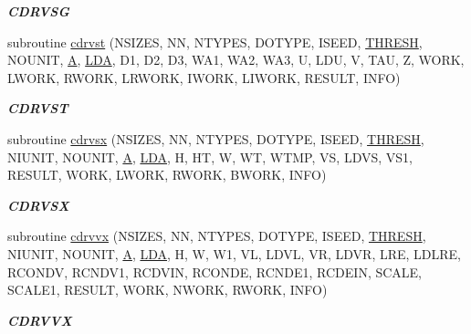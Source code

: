 \begin{DoxyCompactItemize}
\begin{DoxyCompactList}\small\item\em {\bfseries C\+D\+R\+V\+S\+G} \end{DoxyCompactList}\item 
subroutine \hyperlink{group__complex__eig_gacbd6f59fe241010a772c2d06a9d11d89}{cdrvst} (N\+S\+I\+Z\+E\+S, N\+N, N\+T\+Y\+P\+E\+S, D\+O\+T\+Y\+P\+E, I\+S\+E\+E\+D, \hyperlink{zlaqgs_8c_a0656018abfc9fa2821827415f5d5ea57}{T\+H\+R\+E\+S\+H}, N\+O\+U\+N\+I\+T, \hyperlink{classA}{A}, \hyperlink{example__user_8c_ae946da542ce0db94dced19b2ecefd1aa}{L\+D\+A}, D1, D2, D3, W\+A1, W\+A2, W\+A3, U, L\+D\+U, V, T\+A\+U, Z, W\+O\+R\+K, L\+W\+O\+R\+K, R\+W\+O\+R\+K, L\+R\+W\+O\+R\+K, I\+W\+O\+R\+K, L\+I\+W\+O\+R\+K, R\+E\+S\+U\+L\+T, I\+N\+F\+O)
\begin{DoxyCompactList}\small\item\em {\bfseries C\+D\+R\+V\+S\+T} \end{DoxyCompactList}\item 
subroutine \hyperlink{group__complex__eig_ga730ba08b058674ceabf267420c5c4d01}{cdrvsx} (N\+S\+I\+Z\+E\+S, N\+N, N\+T\+Y\+P\+E\+S, D\+O\+T\+Y\+P\+E, I\+S\+E\+E\+D, \hyperlink{zlaqgs_8c_a0656018abfc9fa2821827415f5d5ea57}{T\+H\+R\+E\+S\+H}, N\+I\+U\+N\+I\+T, N\+O\+U\+N\+I\+T, \hyperlink{classA}{A}, \hyperlink{example__user_8c_ae946da542ce0db94dced19b2ecefd1aa}{L\+D\+A}, H, H\+T, W, W\+T, W\+T\+M\+P, V\+S, L\+D\+V\+S, V\+S1, R\+E\+S\+U\+L\+T, W\+O\+R\+K, L\+W\+O\+R\+K, R\+W\+O\+R\+K, B\+W\+O\+R\+K, I\+N\+F\+O)
\begin{DoxyCompactList}\small\item\em {\bfseries C\+D\+R\+V\+S\+X} \end{DoxyCompactList}\item 
subroutine \hyperlink{group__complex__eig_ga2de5d5cdd79b4ab56fd984ac860f1b36}{cdrvvx} (N\+S\+I\+Z\+E\+S, N\+N, N\+T\+Y\+P\+E\+S, D\+O\+T\+Y\+P\+E, I\+S\+E\+E\+D, \hyperlink{zlaqgs_8c_a0656018abfc9fa2821827415f5d5ea57}{T\+H\+R\+E\+S\+H}, N\+I\+U\+N\+I\+T, N\+O\+U\+N\+I\+T, \hyperlink{classA}{A}, \hyperlink{example__user_8c_ae946da542ce0db94dced19b2ecefd1aa}{L\+D\+A}, H, W, W1, V\+L, L\+D\+V\+L, V\+R, L\+D\+V\+R, L\+R\+E, L\+D\+L\+R\+E, R\+C\+O\+N\+D\+V, R\+C\+N\+D\+V1, R\+C\+D\+V\+I\+N, R\+C\+O\+N\+D\+E, R\+C\+N\+D\+E1, R\+C\+D\+E\+I\+N, S\+C\+A\+L\+E, S\+C\+A\+L\+E1, R\+E\+S\+U\+L\+T, W\+O\+R\+K, N\+W\+O\+R\+K, R\+W\+O\+R\+K, I\+N\+F\+O)
\begin{DoxyCompactList}\small\item\em {\bfseries C\+D\+R\+V\+V\+X} \end{DoxyCompactList}\item 

\end{DoxyCompactItemize}
